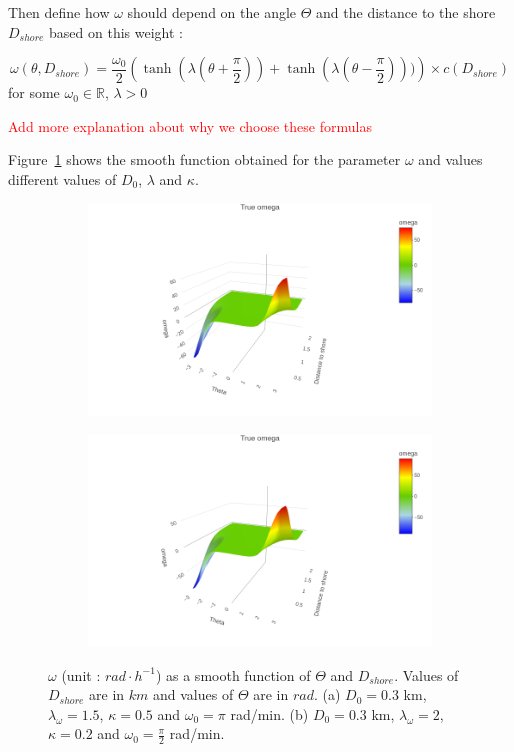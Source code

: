 \documentclass[11pt]{article}
\newcommand {\R}{\mathbb{R}}
\newcommand {\1}{\mathbb{1}}
\begin{document}
Then define how $\omega$ should depend on the angle $\Theta$ and the distance to the shore $D_{shore}$ based on this weight :

\[
\omega(\theta,D_{shore})=\frac{\omega_0}{2}\left(\tanh(\lambda(\theta+\frac{\pi}{2}))+\tanh(\lambda(\theta-\frac{\pi}{2})))\right)\times c(D_{shore})
\]
for some $\omega_0 \in \R$, $\lambda>0$


\textcolor{red}{Add more explanation about why we choose these formulas}

Figure~\ref{fig: trueomega} shows the smooth function obtained for the parameter $\omega$ and  values different values of $D_0$, $\lambda$ and $\kappa$.


\begin{figure}[H]
	\centering
	\begin{subfigure}{0.48\textwidth}
		\centering
		\includegraphics[scale=0.3]{images/simulation study/true_omega_rect.png}
		\caption{}
	\end{subfigure}
	\begin{subfigure}{0.48\textwidth}
		\centering
		\includegraphics[scale=0.3]{images/simulation study/true_omega_fjords.png}
		\caption{}
	\end{subfigure}
	\caption{$\omega$ (unit : $rad \cdot h^{-1}$) as a smooth function of $\Theta$ and $D_{shore}$. Values of $D_{shore}$ are in $km$ and values of $\Theta$ are in $rad$.
		(a) $D_0=0.3$ km, $\lambda_{\omega}=1.5$, $\kappa=0.5$ and $\omega_0=\pi$ rad/min. 
		(b)  $D_0=0.3$ km, $\lambda_{\omega}=2$, $\kappa=0.2$ and $\omega_0=\frac{\pi}{2}$ rad/min.}
	\label{fig: trueomega}
\end{figure}
\end{document}
